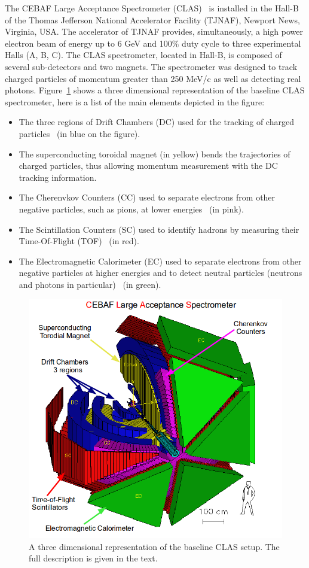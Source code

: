 \documentclass[twocolumn,showpacs,superscriptaddress,groupedaddress]{revtex4}
\begin{document}
The CEBAF Large Acceptance Spectrometer (CLAS)~\cite{CLASref} is installed in 
the Hall-B of the Thomas Jefferson National Accelerator Facility (TJNAF), 
Newport News, Virginia, USA. The accelerator of TJNAF provides, simultaneously, 
a high power electron beam of energy up to 6 GeV and 100$\%$ duty cycle to 
three experimental Halls (A, B, C). The CLAS spectrometer, located in Hall-B, 
is composed of several sub-detectors and two magnets. The spectrometer was 
designed to track charged particles of momentum greater than 250 MeV/c as well 
as detecting real photons. Figure~\ref{fig:CLAS} shows a three dimensional 
representation of the baseline CLAS spectrometer, here is a list of the main elements
depicted in the figure:
\begin{itemize}
 \item The three regions of Drift Chambers (DC) used for the tracking of charged 
    particles~\cite{DCref} (in blue on the figure).
 \item The superconducting toroidal magnet (in yellow) bends the trajectories 
    of charged particles, thus allowing momentum measurement with the DC tracking information.
 \item The Cherenvkov Counters (CC) used to separate electrons from other negative 
    particles, such as pions, at lower energies~\cite{CCref} (in pink).
 \item The Scintillation Counters (SC) used to identify hadrons by measuring their 
    Time-Of-Flight (TOF)~\cite{TOFref} (in red).
 \item The Electromagnetic Calorimeter (EC) used to separate electrons from other negative 
    particles at higher energies and to detect neutral particles (neutrons and 
    photons in particular)~\cite{ECref} (in green).
\end{itemize}

\begin{figure}[tbp]
\centering \includegraphics[scale=0.3]{fig/test_clas.png}
\caption{A three dimensional representation of the baseline CLAS setup. The
   full description is given in the text.} \label{fig:CLAS}
\end{figure}
\end{document}
